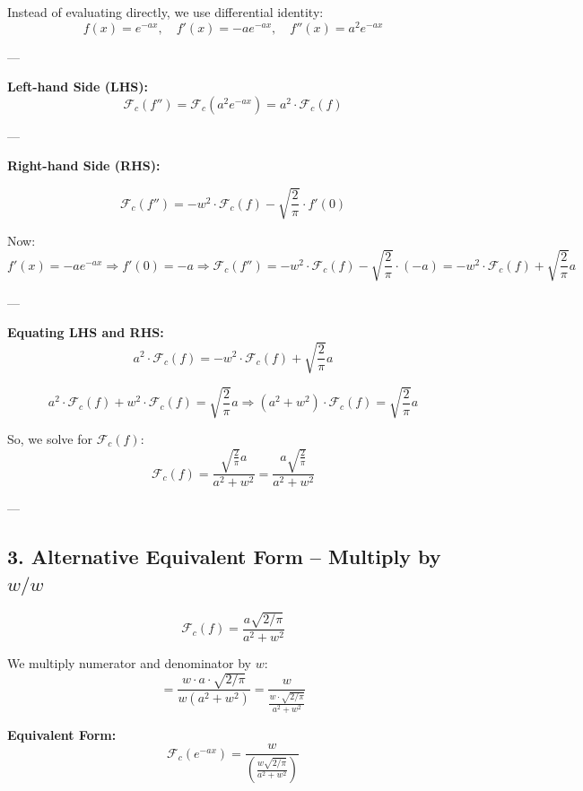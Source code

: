 \documentclass{article}
\begin{document}
Instead of evaluating directly, we use differential identity:
\[
f(x) = e^{-a x}, \quad f'(x) = -a e^{-a x}, \quad f''(x) = a^2 e^{-a x}
\]

---

\textbf{Left-hand Side (LHS):}
\[
\mathcal{F}_c(f'') = \mathcal{F}_c(a^2 e^{-a x}) = a^2 \cdot \mathcal{F}_c(f)
\]

---

\textbf{Right-hand Side (RHS):}

\[
\mathcal{F}_c(f'') = -w^2 \cdot \mathcal{F}_c(f) - \sqrt{ \frac{2}{\pi} } \cdot f'(0)
\]

Now:
\[
f'(x) = -a e^{-a x} \Rightarrow f'(0) = -a
\Rightarrow \mathcal{F}_c(f'') = -w^2 \cdot \mathcal{F}_c(f) - \sqrt{ \frac{2}{\pi} } \cdot (-a)
= -w^2 \cdot \mathcal{F}_c(f) + \sqrt{ \frac{2}{\pi} } a
\]

---

\textbf{Equating LHS and RHS:}
\[
a^2 \cdot \mathcal{F}_c(f) = -w^2 \cdot \mathcal{F}_c(f) + \sqrt{ \frac{2}{\pi} } a
\]

\[
a^2 \cdot \mathcal{F}_c(f) + w^2 \cdot \mathcal{F}_c(f) = \sqrt{ \frac{2}{\pi} } a
\Rightarrow (a^2 + w^2) \cdot \mathcal{F}_c(f) = \sqrt{ \frac{2}{\pi} } a
\]

So, we solve for \( \mathcal{F}_c(f) \):
\[
\mathcal{F}_c(f) = \frac{ \sqrt{ \frac{2}{\pi} } a }{ a^2 + w^2 }
= \boxed{ \frac{ a \sqrt{ \frac{2}{\pi} } }{ a^2 + w^2 } }
\]

---

\subsection*{3. Alternative Equivalent Form – Multiply by \( w/w \)}

\[
\mathcal{F}_c(f) = \frac{ a \sqrt{2/\pi} }{ a^2 + w^2 }
\]

We multiply numerator and denominator by \( w \):
\[
= \frac{ w \cdot a \cdot \sqrt{2/\pi} }{ w(a^2 + w^2) }
= \frac{w}{ \frac{w \cdot \sqrt{2/\pi} }{ a^2 + w^2 } }
\]

\textbf{Equivalent Form:}
\[
\boxed{
\mathcal{F}_c(e^{-a x}) = \frac{w}{ \left( \frac{ w \sqrt{2/\pi} }{ a^2 + w^2 } \right) }
}
\]
\end{document}
